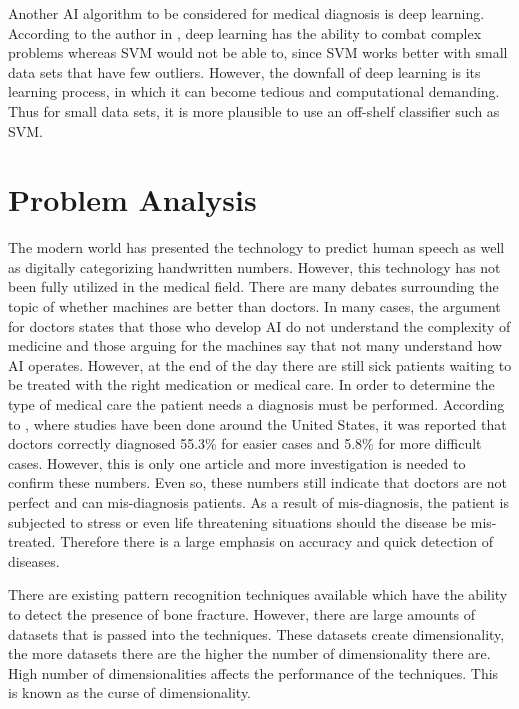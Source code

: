 \documentclass[11pt,twocolumn]{witseiepaper}
\begin{document}
	Another AI algorithm to be considered for medical diagnosis is deep learning. According to the author in \cite{LeCun2015}, deep learning has the ability to combat complex problems whereas SVM would not be able to, since SVM works better with small data sets that have few outliers. However, the downfall of deep learning is its learning process, in which it can become tedious and computational demanding. Thus for small data sets, it is more plausible to use an off-shelf classifier such as SVM.
	
	\section{Problem Analysis}
	The modern world has presented the technology to predict human speech as well as digitally categorizing handwritten numbers. However, this technology has not been fully utilized in the medical field. There are many debates surrounding the topic of whether machines are better than doctors. In many cases, the argument for doctors states that those who develop AI do not understand the complexity of medicine and those arguing for the machines say that not many understand how AI operates. However, at the end of the day there are still sick patients waiting to be treated with the right medication or medical care. In order to determine the type of medical care the patient needs a diagnosis must be performed. According to \cite{meyer_physicians_2013}, where studies have been done around the United States, it was reported that doctors correctly diagnosed 55.3\% for easier cases and 5.8\% for more difficult cases. However, this is only one article and more investigation is needed to confirm these numbers. Even so, these numbers still indicate that doctors are not perfect and can mis-diagnosis patients. As a result of mis-diagnosis, the patient is subjected to stress or even life threatening situations should the disease be mis-treated. Therefore there is a large emphasis on accuracy and quick detection of diseases.
	
	There are existing pattern recognition techniques available which have the ability to detect the presence of bone fracture. However, there are large amounts of datasets that is passed into the techniques. These datasets create dimensionality, the more datasets there are the higher the number of dimensionality there are. High number of dimensionalities affects the performance of the techniques. This is known as the curse of dimensionality. 
	
\end{document}
